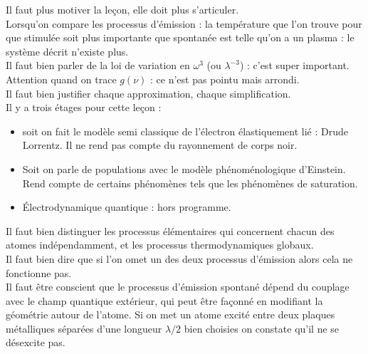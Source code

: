 \documentclass[12pt,prb,aps,epsf]{article}
\begin{document}
Il faut plus motiver la leçon, elle doit plus s'articuler.\\

Lorsqu'on compare les processus d'émission : la température que l'on trouve pour que stimulée soit plus importante que spontanée est telle qu'on a un plasma : le système décrit n'existe plus.\\

Il faut bien parler de la loi de variation en $\omega ^3$ (ou $\lambda^{-3}$) : c'est super important.\\

Attention quand on trace $g(\nu)$ : ce n'est pas pointu mais arrondi.\\

Il faut bien justifier chaque approximation, chaque simplification.\\

Il y a trois étages pour cette leçon :
\begin{itemize}
	\item soit on fait le modèle semi classique de l'électron élastiquement lié : Drude Lorrentz. Il ne rend pas compte du rayonnement de corps noir.
	\item Soit on parle de populations avec le modèle phénoménologique d'Einstein. Rend compte de certains phénomènes tels que les phénomènes de saturation.
	\item Électrodynamique quantique : hors programme.
\end{itemize}

Il faut bien distinguer les processus élémentaires qui concernent chacun des atomes indépendamment, et les processus thermodynamiques globaux.\\

Il faut bien dire que si l'on omet un des deux processus d'émission alors cela ne fonctionne pas.\\

Il faut être conscient que le processus d'émission spontané dépend du couplage avec le champ quantique extérieur, qui peut être façonné en modifiant la géométrie autour de l'atome. Si on met un atome excité entre deux plaques métalliques séparées d'une longueur $\lambda/2$ bien choisies on constate qu'il ne se désexcite pas.

	
\end{document}
